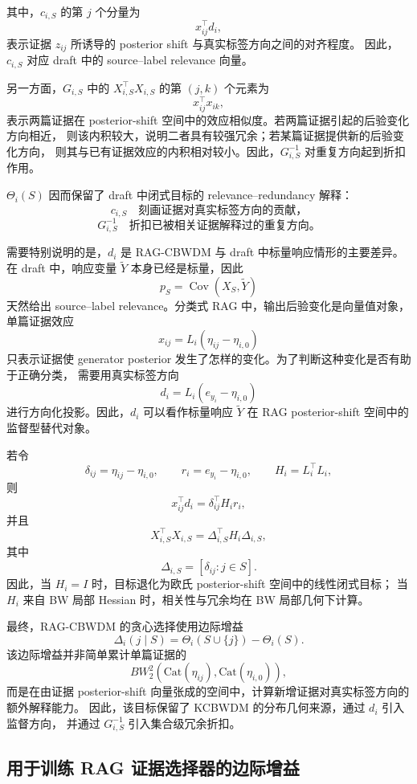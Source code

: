 \documentclass[UTF8,a4paper,12pt,oneside]{ctexart}
\numberwithin{equation}{section}
\begin{document}
其中，\(c_{i,S}\) 的第 \(j\) 个分量为
\[
    x_{ij}^{\top}d_i,
\]
表示证据 \(z_{ij}\) 所诱导的 posterior shift 与真实标签方向之间的对齐程度。
因此，\(c_{i,S}\) 对应 draft 中的 source--label relevance 向量。

另一方面，\(G_{i,S}\) 中的 \(X_{i,S}^{\top}X_{i,S}\) 的第 \((j,k)\) 个元素为
\[
    x_{ij}^{\top}x_{ik},
\]
表示两篇证据在 posterior-shift 空间中的效应相似度。若两篇证据引起的后验变化方向相近，
则该内积较大，说明二者具有较强冗余；若某篇证据提供新的后验变化方向，
则其与已有证据效应的内积相对较小。因此，\(G_{i,S}^{-1}\) 对重复方向起到折扣作用。

\(\Theta_i(S)\) 因而保留了 draft 中闭式目标的 relevance--redundancy 解释：
\[
    c_{i,S}
    \quad\text{刻画证据对真实标签方向的贡献，}
\]
\[
    G_{i,S}^{-1}
    \quad\text{折扣已被相关证据解释过的重复方向。}
\]

需要特别说明的是，\(d_i\) 是 RAG-CBWDM 与 draft 中标量响应情形的主要差异。
在 draft 中，响应变量 \(\widetilde Y\) 本身已经是标量，因此
\[
    p_S=\operatorname{Cov}(X_S,\widetilde Y)
\]
天然给出 source--label relevance。分类式 RAG 中，输出后验变化是向量值对象，
单篇证据效应
\[
    x_{ij}=L_i(\eta_{ij}-\eta_{i,0})
\]
只表示证据使 generator posterior 发生了怎样的变化。为了判断这种变化是否有助于正确分类，
需要用真实标签方向
\[
    d_i=L_i(e_{y_i}-\eta_{i,0})
\]
进行方向化投影。因此，\(d_i\) 可以看作标量响应 \(\widetilde Y\)
在 RAG posterior-shift 空间中的监督型替代对象。

若令
\[
    \delta_{ij}=\eta_{ij}-\eta_{i,0},
    \qquad
    r_i=e_{y_i}-\eta_{i,0},
    \qquad
    H_i=L_i^\top L_i,
\]
则
\[
    x_{ij}^{\top}d_i
    =
    \delta_{ij}^{\top}H_i r_i,
\]
并且
\[
    X_{i,S}^{\top}X_{i,S}
    =
    \Delta_{i,S}^{\top}H_i\Delta_{i,S},
\]
其中
\[
    \Delta_{i,S}
    =
    [\delta_{ij}:j\in S].
\]
因此，当 \(H_i=I\) 时，目标退化为欧氏 posterior-shift 空间中的线性闭式目标；
当 \(H_i\) 来自 BW 局部 Hessian 时，相关性与冗余均在 BW 局部几何下计算。

最终，RAG-CBWDM 的贪心选择使用边际增益
\[
    \Delta_i(j\mid S)
    =
    \Theta_i(S\cup\{j\})
    -
    \Theta_i(S).
\]
该边际增益并非简单累计单篇证据的
\[
    BW_2^2
    \left(
        \mathrm{Cat}(\eta_{ij}),
        \mathrm{Cat}(\eta_{i,0})
    \right),
\]
而是在由证据 posterior-shift 向量张成的空间中，计算新增证据对真实标签方向的额外解释能力。
因此，该目标保留了 KCBWDM 的分布几何来源，通过 \(d_i\) 引入监督方向，
并通过 \(G_{i,S}^{-1}\) 引入集合级冗余折扣。

\subsection{用于训练 RAG 证据选择器的边际增益}
\end{document}
